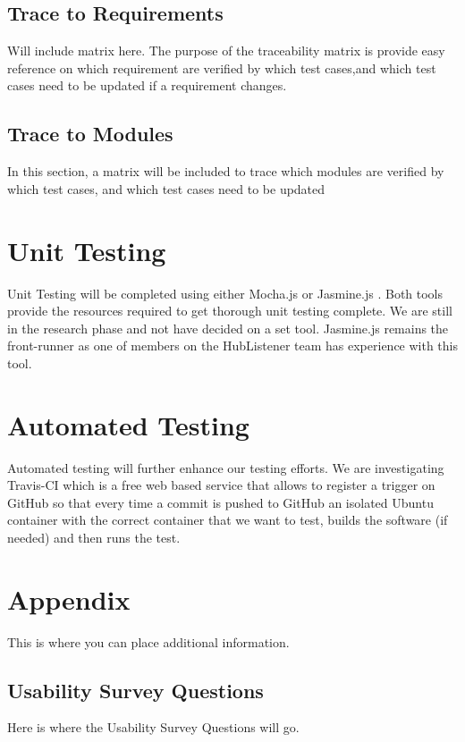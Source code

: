 \documentclass[12pt, titlepage]{article}
\begin{document}
\subsection{Trace to Requirements}

Will include matrix here. The purpose of the traceability matrix is provide easy reference on which requirement are verified by which test cases,and which test cases need to be updated if a requirement changes. 
		
\subsection{Trace to Modules}		

In this section, a matrix will  be included to trace which modules are verified by which test cases, and which test cases need to be updated 

\section{Unit Testing}

Unit Testing will  be completed using either Mocha.js or Jasmine.js . Both tools provide the resources required to get thorough unit testing complete. We are still in the research phase and not have decided on a set tool. Jasmine.js remains the front-runner as one of members on the HubListener team has experience with this tool. 


\section{Automated Testing}

Automated testing will further enhance our testing efforts. We are investigating Travis-CI which  is a free web based service that allows  to register a trigger on GitHub so that every time a commit is pushed to GitHub an isolated Ubuntu container with the correct container that we want to test, builds the software (if needed) and then runs the test.


\section{Appendix}

This is where you can place additional information.

\subsection{Usability Survey Questions}
Here is where the Usability Survey Questions will go. 




\end{document}
